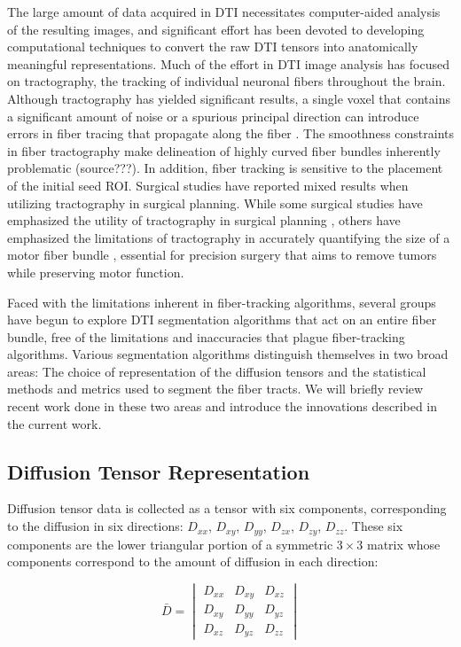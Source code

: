 \documentclass[10pt,a4paper, journal]{IEEEtran}
\begin{document}
The large amount of data acquired in DTI necessitates computer-aided analysis of the resulting images, and significant effort has been devoted to developing computational techniques to convert the raw DTI tensors into anatomically meaningful representations.  Much of the effort in DTI image analysis has focused on tractography, the tracking of individual neuronal fibers throughout the brain.  Although tractography has yielded significant results, a single voxel that contains a significant amount of noise or a spurious principal direction can introduce errors in fiber tracing that propagate along the fiber \cite{chung_principles_2011,yamada_diffusion_2009}.  The smoothness constraints in fiber tractography make delineation of highly curved fiber bundles inherently problematic (source???). In addition, fiber tracking is sensitive to the placement of the initial seed ROI.  Surgical studies have reported mixed results when utilizing tractography in surgical planning.  While some surgical studies have emphasized the utility of tractography in surgical planning \cite{coenen_intraoperative_2003}, others have emphasized the limitations of tractography in accurately quantifying the size of a motor fiber bundle \cite{kinoshita_fiber-tracking_2005}, essential for precision surgery that aims to remove tumors while preserving motor function. 

Faced with the limitations inherent in fiber-tracking algorithms, several groups have begun to explore DTI segmentation algorithms that act on an entire fiber bundle, free of the limitations and inaccuracies that plague fiber-tracking algorithms.  Various segmentation algorithms distinguish themselves in two broad areas: The choice of representation of the diffusion tensors and the statistical methods and metrics used to segment the fiber tracts.  We will briefly review recent work done in these two areas and introduce the innovations described in the current work. 

\subsection{Diffusion Tensor Representation}
Diffusion tensor data is collected as a tensor with six components, corresponding to the diffusion in six directions: $D_{xx}$, $D_{xy}$, $D_{yy}$, $D_{zx}$, $D_{zy}$, $D_{zz}$.  These six components are the lower triangular portion of a symmetric $3 \times 3$ matrix whose components correspond to the amount of diffusion in each direction:

\begin{equation*}
\bar{D} = \begin{vmatrix}
D_{xx} & D_{xy} &  D_{xz} \\
D_{xy} &  D_{yy} &  D_{yz} \\
D_{xz} & D_{yz} &  D_{zz}
\end{vmatrix}
\end{equation*}
  
\end{document}
